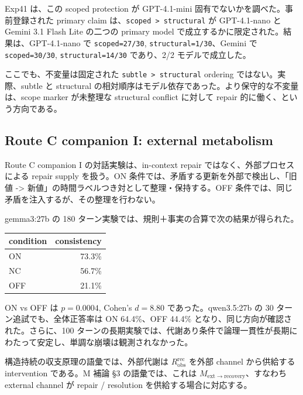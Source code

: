 \documentclass[12pt,a4paper]{article}
\begin{document}
Exp41 は、この scoped protection が GPT-4.1-mini 固有でないかを調べた。事前登録された primary claim は、\texttt{scoped\ \textgreater{}\ structural} が GPT-4.1-nano と Gemini 3.1 Flash Lite の二つの primary model で成立するかに限定された。結果は、GPT-4.1-nano で \texttt{scoped=27/30}, \texttt{structural=1/30}、Gemini で \texttt{scoped=30/30}, \texttt{structural=14/30} であり、2/2 モデルで成立した。

ここでも、不変量は固定された \texttt{subtle\ \textgreater{}\ structural} ordering ではない。実際、subtle と structural の相対順序はモデル依存であった。より保守的な不変量は、scope marker が未整理な structural conflict に対して repair 的に働く、という方向である。

\subsection{Route C companion I: external metabolism}\label{route-c-companion-i-external-metabolism}

Route C companion I の対話実験は、in-context repair ではなく、外部プロセスによる repair supply を扱う。ON 条件では、矛盾する更新を外部で検出し、「旧値 -\textgreater{} 新値」の時間ラベルつき対として整理・保持する。OFF 条件では、同じ矛盾を注入するが、その整理を行わない。

gemma3:27b の 180 ターン実験では、規則＋事実の合算で次の結果が得られた。

{\def\LTcaptype{table} %
\begin{longtable}[]{@{}lr@{}}
\toprule\noalign{}
condition & consistency \\
\midrule\noalign{}
\endhead
\bottomrule\noalign{}
\endlastfoot
ON & 73.3\% \\
NC & 56.7\% \\
OFF & 21.1\% \\
\end{longtable}
}

ON vs OFF は \(p=0.0004\), Cohen's \(d=8.80\) であった。qwen3.5:27b の 30 ターン追試でも、全体正答率は ON 64.4\%、OFF 44.4\% となり、同じ方向が確認された。さらに、100 ターンの長期実験では、代謝あり条件で論理一貫性が長期にわたって安定し、単調な崩壊は観測されなかった。

構造持続の収支原理の語彙では、外部代謝は \(R_{\mathrm{obs}}^{\mathrm{rec}}\) を外部 channel から供給する intervention である。M 補論 §3 の語彙では、これは \(M_{\mathrm{ext}\to\mathrm{recovery}}\)、すなわち external channel が repair / resolution を供給する場合に対応する。
\end{document}
